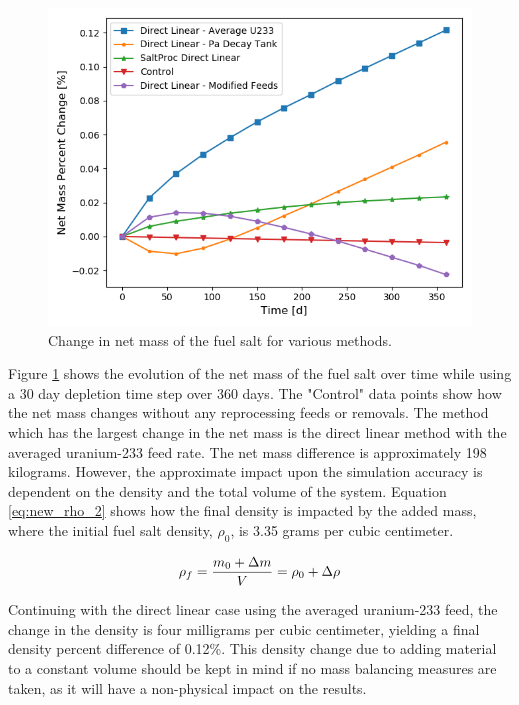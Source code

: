 \begin{figure}[H]
  \centering
  \includegraphics[scale=0.7]{images/net-mass-pcnt-change.png}
  \caption{Change in net mass of the fuel salt for various methods.}
   \label{fig:net-mass-bal}
\end{figure}

Figure \ref{fig:net-mass-bal} shows the evolution of the net mass of the fuel salt over time while using a 30 day depletion time step over 360 days. The "Control" data points show how the net mass changes without any reprocessing feeds or removals. 
The method which has the largest change in the net mass is the direct linear method with the averaged uranium-233 feed rate. The net mass difference is approximately 198 kilograms. 
However, the approximate impact upon the simulation accuracy is dependent on the density and the total volume of the system. Equation \eqref{eq:new_rho_2} shows how the final density is impacted by the added mass, where the initial fuel salt density, $\rho_0$, is 3.35 grams per cubic centimeter. 

\begin{equation} \hfill
\rho_f = \frac{m_0 + \Delta m}{V} = \rho_0 + \Delta \rho
\hfill\label{eq:new_rho_2} \end{equation}

Continuing with the direct linear case using the averaged uranium-233 feed, the change in the density is four milligrams per cubic centimeter, yielding a final density percent difference of 0.12\%. This density change due to adding material to a constant volume should be kept in mind if no mass balancing measures are taken, as it will have a non-physical impact on the results.
